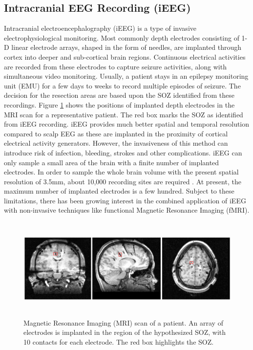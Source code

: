 \subsection{Intracranial EEG Recording (iEEG)}
Intracranial electroencephalography (iEEG) is a type of invasive electrophysiological monitoring. Most commonly depth electrodes consisting of 1-D linear electrode arrays, shaped in the form of needles, are implanted through cortex into deeper and sub-cortical brain regions. Continuous electrical activities are recorded from these electrodes to capture seizure activities, along with simultaneous video monitoring. Usually, a patient stays in an epilepsy monitoring unit (EMU) for a few days to weeks to record multiple episodes of seizure. The decision for the resection areas are based upon the SOZ identified from these recordings. Figure \ref{fig:structural_scan} shows the positions of implanted depth electrodes in the MRI scan for a representative patient. The red box marks the SOZ as identified from iEEG recording. iEEG provides much better spatial and temporal resolution compared to scalp EEG as these are implanted in the proximity of cortical electrical activity generators. However, the invasiveness of this method can introduce risk of infection, bleeding, strokes and other complications. iEEG can only sample a small area of the brain with a finite number of implanted electrodes. In order to sample the whole brain volume with the present spatial resolution of 3.5mm, about 10,000 recording sites are required \citep{lachaux2003intracranial}. At present, the maximum number of implanted electrodes is a few hundred. Subject to these limitations, there has been growing interest in the combined application of iEEG with non-invasive techniques like functional Magnetic Resonance Imaging (fMRI). 

\begin{figure}
\centerline{
	\includegraphics[height =2in]{Plots/Structural scan.jpg}
	}
	\caption{ Magnetic Resonance Imaging (MRI) scan of a patient. An array of electrodes is implanted in the region of the hypothesized SOZ, with 10 contacts for each electrode. The red box highlights the SOZ.
	\label{fig:structural_scan}
}
\end{figure}


